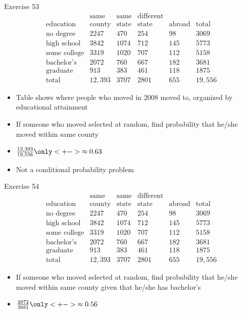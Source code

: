 \documentclass[handout]{beamer}
\theoremstyle{definition}
\begin{document}
\begin{frame}{Exercise 53}
\[\begin{array}{r|llll|l}
&\text{same}&\text{same}&\text{different}&&\\
\text{education}&\text{county}
&\text{state}&\text{state}&\text{abroad}&\text{total}\\\hline
\text{no degree}&2247&470&254&98&3069\\
\text{high school}&3842&1074&712&145&5773\\
\text{some college}&3319&1020&707&112&5158\\
\text{bachelor's}&2072&760&667&182&3681\\
\text{graduate}&913&383&461&118&1875\\\hline
\text{total}&12,393&3707&2801&655&19,556
\end{array}\]
\begin{itemize}
\item Table shows where people who moved in 2008
moved to, organized by educational attainment
\item If someone who moved selected at random, find probability
that he/she moved within same county
\item $\frac{12,393}{19,556}\only<+->{\approx 0.63}$
\item Not a conditional probability problem
\end{itemize}
\end{frame}

\begin{frame}{Exercise 54}
\[\begin{array}{r|llll|l}
&\text{same}&\text{same}&\text{different}&&\\
\text{education}&\text{county}
&\text{state}&\text{state}&\text{abroad}&\text{total}\\\hline
\text{no degree}&2247&470&254&98&3069\\
\text{high school}&3842&1074&712&145&5773\\
\text{some college}&3319&1020&707&112&5158\\
\text{bachelor's}&2072&760&667&182&3681\\
\text{graduate}&913&383&461&118&1875\\\hline
\text{total}&12,393&3707&2801&655&19,556
\end{array}\]
\begin{itemize}
\item If someone who moved selected at random, find probability
that he/she moved within same county given that he/she has bachelor's
\item $\frac{2072}{3681}\only<+->{\approx 0.56}$
\end{itemize}
\end{frame}
\end{document}
